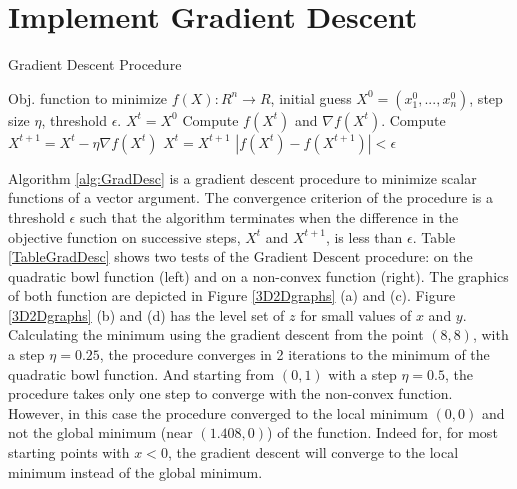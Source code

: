 \documentclass{article}
\begin{document}
 


\section{Implement Gradient Descent}

\begin{algorithm}[htb]
   \caption{Gradient Descent Procedure}
   \label{alg:GradDesc}
\begin{algorithmic}
   \STATE Obj. function to minimize $f(X):R^n \rightarrow R$, 
   \STATE initial guess  $X^0=(x^0_1,...,x^0_n)$, 
   \STATE step size $\eta$, 
   \STATE threshold $\epsilon$.
    $X^t=X^0$
   \REPEAT
   \STATE Compute  $f(X^t)$ and $\nabla f(X^t)$.
   \STATE Compute $X^{t+1}=X^t-\eta \nabla f(X^t)$
   \STATE $X^t=X^{t+1}$
   \UNTIL $\left| f(X^{t})-f(X^{t+1})\right|<\epsilon$
\end{algorithmic}
\end{algorithm}

Algorithm \ref{alg:GradDesc} is a gradient descent procedure to minimize scalar functions of a vector argument. The convergence criterion of the procedure is a threshold $\epsilon$ such that the algorithm terminates when the difference in the objective function on successive steps, $X^t$ and $X^{t+1}$, is less than $\epsilon$. Table \ref{TableGradDesc} shows two tests of the Gradient Descent procedure: on the quadratic bowl function (left) and on a non-convex function (right). The graphics of both function are depicted in Figure \ref{3D2Dgraphs} (a) and (c). Figure \ref{3D2Dgraphs} (b) and (d) has the level set of $z$ for small values of $x$ and $y$. Calculating the minimum using the gradient descent from the point $(8,8)$, with a step $\eta=0.25$, the procedure converges in 2 iterations to the minimum of the quadratic bowl function. And starting from $(0,1)$ with a step $\eta=0.5$, the procedure takes only one step to converge with the non-convex function. However, in this case the procedure converged to the local minimum $(0,0)$ and not the global minimum (near $(1.408,0)$) of the function. Indeed for, for most starting points with $x<0$, the gradient descent will converge to the local minimum instead of the global minimum.
 
\end{document}

